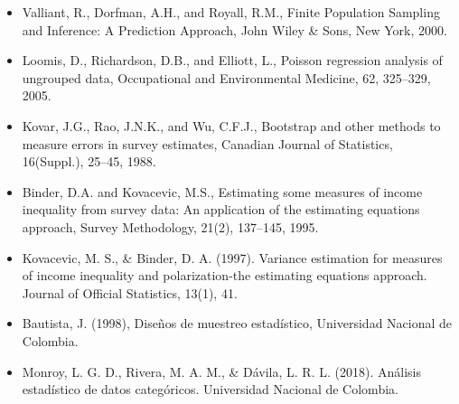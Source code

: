 \documentclass[
  12pt,
]{book}
\begin{document}
\begin{itemize}
\item
  Valliant, R., Dorfman, A.H., and Royall, R.M., Finite Population Sampling and Inference: A Prediction Approach, John Wiley \& Sons, New York, 2000.
\item
  Loomis, D., Richardson, D.B., and Elliott, L., Poisson regression analysis of ungrouped data, Occupational and Environmental Medicine, 62, 325--329, 2005.
\item
  Kovar, J.G., Rao, J.N.K., and Wu, C.F.J., Bootstrap and other methods to measure errors in survey estimates, Canadian Journal of Statistics, 16(Suppl.), 25--45, 1988.
\item
  Binder, D.A. and Kovacevic, M.S., Estimating some measures of income inequality from survey data: An application of the estimating equations approach, Survey Methodology, 21(2), 137--145, 1995.
\item
  Kovacevic, M. S., \& Binder, D. A. (1997). Variance estimation for measures of income inequality and polarization-the estimating equations approach. Journal of Official Statistics, 13(1), 41.
\item
  Bautista, J. (1998), Diseños de muestreo estadístico, Universidad Nacional de Colombia.
\item
  Monroy, L. G. D., Rivera, M. A. M., \& Dávila, L. R. L. (2018). Análisis estadístico de datos categóricos. Universidad Nacional de Colombia.
\end{itemize}
\end{document}
